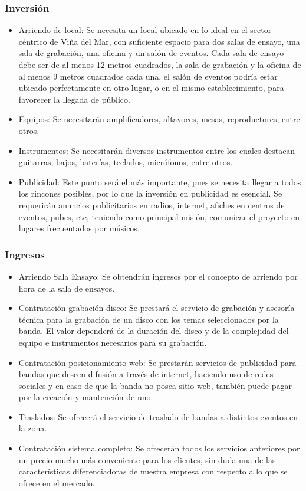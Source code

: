 \subsubsection{Inversión}
\begin{itemize}
	\item Arriendo de local:
			Se necesita un local ubicado en lo ideal en el sector céntrico de Viña del Mar,
			con suficiente espacio para dos salas de ensayo, una sala de grabación, una oficina
			y un salón de eventos.
			Cada sala de ensayo debe ser de al menos 12 metros cuadrados,
			la sala de grabación y la oficina de al menos 9 metros cuadrados cada una,
			el salón de eventos podría estar ubicado perfectamente en otro lugar,
			o en el mismo establecimiento, para favorecer la llegada de público.
	\item Equipos:
			Se necesitarán amplificadores, altavoces, mesas, reproductores, entre otros.
	\item Instrumentos:
			Se necesitarán diversos instrumentos entre los cuales destacan guitarras, bajos, baterías,
			teclados, micrófonos, entre otros.
	\item Publicidad:
			Este punto será el más importante, pues se necesita llegar a todos los rincones posibles,
			por lo que la inversión en publicidad es esencial.
			Se requerirán anuncios publicitarios en radios, internet, afiches en centros de eventos,
			pubes, etc, teniendo como principal misión, comunicar el proyecto en lugares
			frecuentados por músicos.
\end{itemize}

\subsubsection{Ingresos}
\begin{itemize}
	\item Arriendo Sala Ensayo:
			Se obtendrán ingresos por el concepto de arriendo por hora de la sala de ensayos.
	\item Contratación grabación disco:
			Se prestará el servicio de grabación y asesoría técnica para la grabación de un
			disco con los temas seleccionados por la banda.
			El valor dependerá de la duración del disco y de la complejidad del equipo
			e instrumentos necesarios para su grabación.
	\item Contratación posicionamiento web:
			Se prestarán servicios de publicidad para bandas que deseen difusión a través
			de internet, haciendo uso de redes sociales y en caso de que la banda no posea
			sitio web, también puede pagar por la creación y mantención de uno.
	\item Traslados:
			Se ofrecerá el servicio de traslado de bandas a distintos eventos en la zona.
	\item Contratación sistema completo:
			Se ofrecerán todos los servicios anteriores por un precio mucho más conveniente
			para los clientes, sin duda una de las características diferenciadoras de
			nuestra empresa con respecto a lo que se ofrece en el mercado.
\end{itemize}

